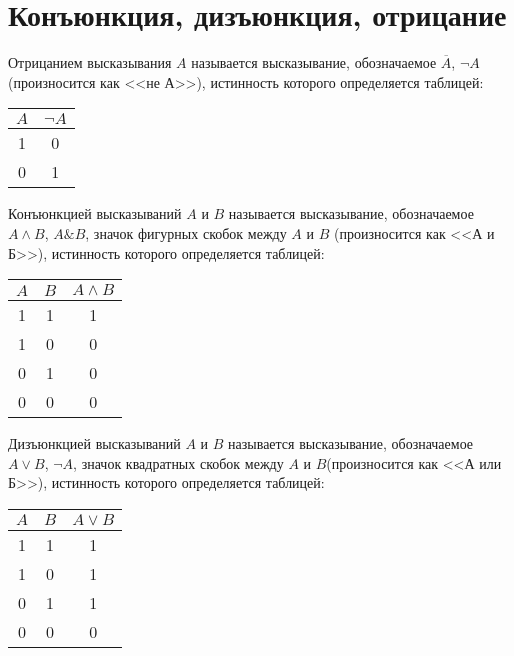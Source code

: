 \section{Конъюнкция, дизъюнкция, отрицание}

\begin{definition}[Отрицание]
	Отрицанием высказывания $A$ называется высказывание, обозначаемое $\overline A$, $\neg A$ (произносится как <<не А>>), истинность которого определяется таблицей:
	\begin{center}
		\begin{tabular}{ |c|c| } 
			\hline
			$A$ & $\neg A$ \\
			\hline 
			1 & 0 \\ 
			0 & 1 \\ 
			\hline
		\end{tabular}
	\end{center}
\end{definition}

\begin{definition}[Конъюнкция]
	Конъюнкцией высказываний $A$ и $B$ называется высказывание, обозначаемое $A \land B$, $A \& B$, значок фигурных скобок между $A$ и $B$ (произносится как <<А и Б>>), истинность которого определяется таблицей:
	\begin{center}
		\begin{tabular}{ |c|c|c| } 
			\hline
			$A$ & $B$ & $A \land B$ \\
			\hline 
			1 & 1 & 1 \\ 
			1 & 0 & 0 \\
			0 & 1 & 0 \\ 
			0 & 0 & 0 \\  
			\hline
		\end{tabular}
	\end{center}
\end{definition}

\begin{definition}[Дизъюнкция]
	Дизъюнкцией высказываний  $A$ и $B$ называется высказывание, обозначаемое $A \lor B$, $\neg A$, значок квадратных скобок между $A$ и $B$(произносится как <<А или Б>>), истинность которого определяется таблицей:
	\begin{center}
		\begin{tabular}{ |c|c|c| } 
			\hline
			$A$ & $B$ & $A \lor B$ \\
			\hline 
			1 & 1 & 1 \\ 
			1 & 0 & 1 \\
			0 & 1 & 1 \\ 
			0 & 0 & 0 \\  
			\hline
		\end{tabular}
	\end{center}
\end{definition}

